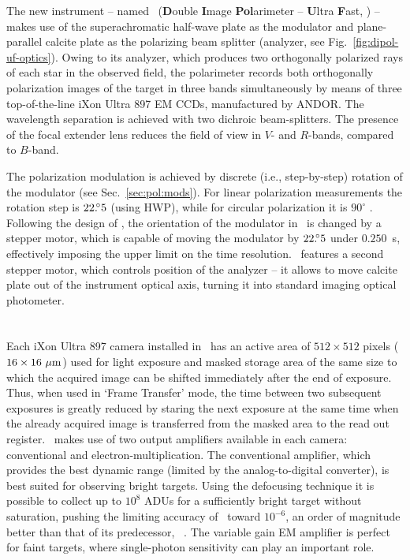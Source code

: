 The new instrument -- named \DUF\ (\textbf{D}ouble \textbf{I}mage \textbf{Pol}arimeter -- \textbf{U}ltra \textbf{F}ast, \paperI) -- makes use of the superachromatic half-wave plate as the modulator and plane-parallel calcite plate as the polarizing beam splitter (analyzer, see Fig.~\ref{fig:dipol-uf-optics}).
Owing to its analyzer, which produces two orthogonally polarized rays of each star in the observed field, the polarimeter records both orthogonally polarization images of the target in three bands simultaneously by means of three top-of-the-line iXon Ultra 897 \gls{EM} \glspl{CCD}, manufactured by ANDOR.
The wavelength separation is achieved with  two dichroic beam-splitters.
The presence of the focal extender lens reduces the field of view in $V$- and $R$-bands, compared to $B$-band.


The polarization modulation is achieved by discrete (i.e., step-by-step) rotation of the modulator (see Sec.~\ref{sec:pol:mods}). 
For linear polarization measurements the rotation step is $22\mbox{\ensuremath{.\!^\circ}}5$  (using \gls{HWP}), while for circular polarization it is $90^\circ$ \citep[using \gls{QWP}, ][]{Berdyugin2019}.
Following the design of \DP, the orientation of the modulator in \DUF\ is changed by a stepper motor, which is capable of moving the modulator by $22\mbox{\ensuremath{.\!^\circ}}5$  under $0.250$~s, effectively imposing the upper limit on the time resolution.
\DUF\ features a second stepper motor, which controls position of the analyzer -- it allows to move calcite plate out of the instrument optical axis, turning it into standard imaging optical photometer.


\section{ }
Each iXon Ultra 897 camera installed in \DUF\ has an active area of $512 \times 512$ pixels ($16 \times 16~\mu\mathrm{m}$) used for light exposure and masked storage area of the same size to which the acquired image can be shifted immediately after the end of exposure.
Thus, when used in `Frame Transfer' mode, the time between two subsequent exposures is greatly reduced by staring the next exposure at the same time when the already acquired image is transferred from the masked area to the read out register.
\DUF\ makes use of two output amplifiers available in each camera: conventional and electron-multiplication.
The conventional amplifier, which provides the best dynamic range (limited by the analog-to-digital converter), is best suited for observing bright targets.
Using the defocusing technique it is possible to collect up to $10^8$ \glspl{ADU} for a sufficiently bright target without saturation, pushing the limiting accuracy of \DUF\ toward $10^{-6}$, an order of magnitude better than that of its predecessor, \DP\ \paperIp.
The variable gain \gls{EM} amplifier is perfect for faint targets, where single-photon sensitivity can play an important role.


